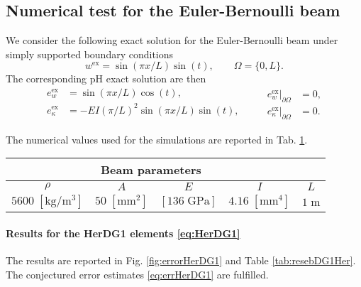 \subsection{Numerical test for the Euler-Bernoulli beam}
We consider the following exact solution for the Euler-Bernoulli beam under simply supported boundary conditions
\begin{equation}
w^{\text{ex}} = \sin(\pi x/ L)\sin(t), \qquad \Omega = \{0, L\}.
\end{equation}
The corresponding pH exact solution are then
\begin{equation}
\begin{aligned}
e_w^{\text{ex}} &= \sin\left({\pi x}/{L}\right)\cos(t), \\
e_\kappa^{\text{ex}} &= - EI \left({\pi}/{L}\right)^2 \sin\left({\pi x}/{L}\right)\sin(t), \\
\end{aligned} \qquad 
\begin{aligned}
e_w^{\text{ex}}\vert_{\partial\Omega} &= 0, \\
e_\kappa^{\text{ex}}\vert_{\partial\Omega} &= 0.
\end{aligned}
\end{equation}

The numerical values used for the simulations are reported in Tab. \ref{tab:parEB}.

\begin{table}[htbp]
	\centering
	\begin{tabular}{ccccc}
		\hline 
		\multicolumn{4}{c}{Beam parameters} \\ 
		\hline 
		 $\rho$ & $A$ & $E$ & $I$ & $L$\\
		$5600\; [\textrm{kg}/\textrm{m}^3]$ & $50\; [\textrm{mm}^2]$ &  $[136 \; \textrm{GPa}]$ & $4.16\; [\textrm{mm}^4]$ & $1\; \textrm{m}$ \\ 
		\hline 
	\end{tabular} 
	\captionsetup{width=0.95\linewidth}
	\vspace{1mm}
	\label{tab:parEB}
\end{table}

\paragraph{Results for the HerDG1 elements \ref{eq:HerDG1}}
The results are reported in Fig. \ref{fig:errorHerDG1} and Table \ref{tab:resebDG1Her}. The conjectured error estimates \eqref{eq:errHerDG1} are fulfilled.

